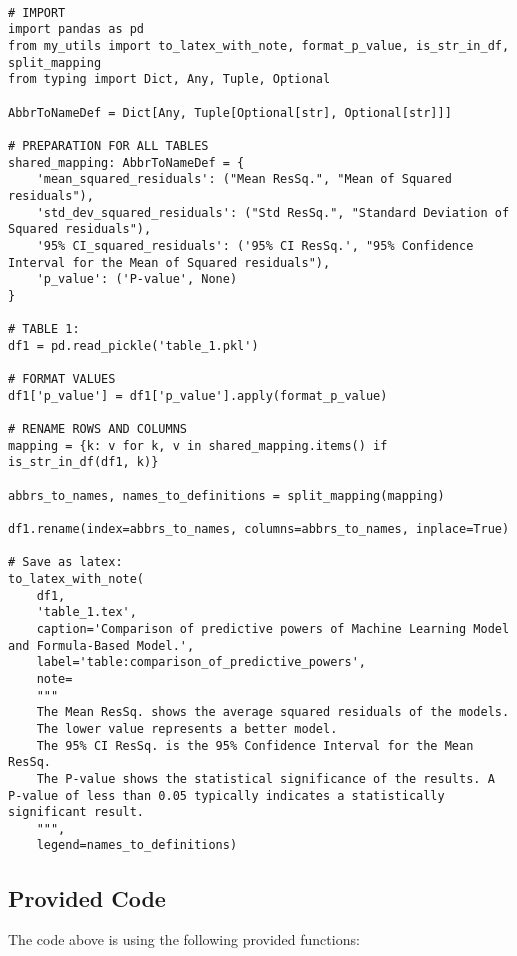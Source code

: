 \documentclass[11pt]{article}
\begin{document}
\begin{verbatim}

# IMPORT
import pandas as pd
from my_utils import to_latex_with_note, format_p_value, is_str_in_df, split_mapping
from typing import Dict, Any, Tuple, Optional

AbbrToNameDef = Dict[Any, Tuple[Optional[str], Optional[str]]]

# PREPARATION FOR ALL TABLES
shared_mapping: AbbrToNameDef = {
    'mean_squared_residuals': ("Mean ResSq.", "Mean of Squared residuals"),
    'std_dev_squared_residuals': ("Std ResSq.", "Standard Deviation of Squared residuals"),
    '95% CI_squared_residuals': ('95% CI ResSq.', "95% Confidence Interval for the Mean of Squared residuals"),
    'p_value': ('P-value', None)
}

# TABLE 1:
df1 = pd.read_pickle('table_1.pkl')

# FORMAT VALUES
df1['p_value'] = df1['p_value'].apply(format_p_value)

# RENAME ROWS AND COLUMNS
mapping = {k: v for k, v in shared_mapping.items() if is_str_in_df(df1, k)} 

abbrs_to_names, names_to_definitions = split_mapping(mapping)

df1.rename(index=abbrs_to_names, columns=abbrs_to_names, inplace=True)

# Save as latex:
to_latex_with_note(
    df1, 
    'table_1.tex', 
    caption='Comparison of predictive powers of Machine Learning Model and Formula-Based Model.', 
    label='table:comparison_of_predictive_powers', 
    note=
    """
    The Mean ResSq. shows the average squared residuals of the models. 
    The lower value represents a better model. 
    The 95% CI ResSq. is the 95% Confidence Interval for the Mean ResSq.
    The P-value shows the statistical significance of the results. A P-value of less than 0.05 typically indicates a statistically significant result.
    """, 
    legend=names_to_definitions)

\end{verbatim}

\subsection{Provided Code}
The code above is using the following provided functions:
\end{document}
